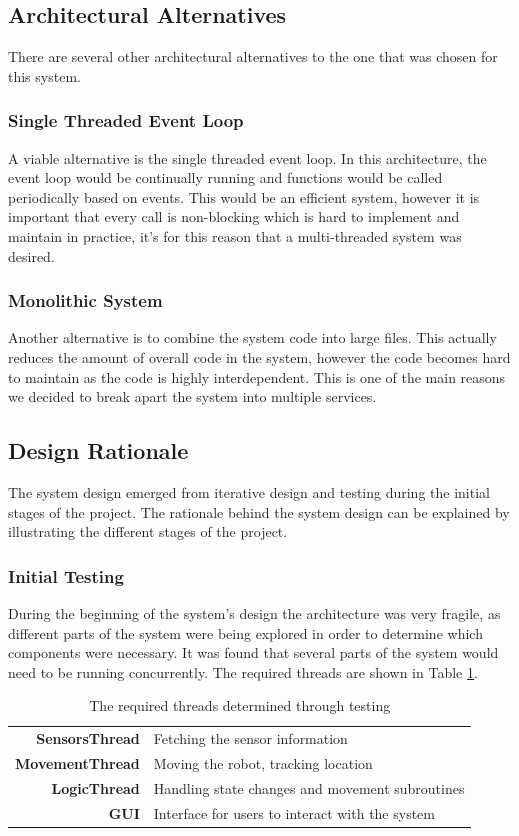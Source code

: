 \subsection{Architectural Alternatives}
There are several other architectural alternatives to the one that was chosen for this system. 

\subsubsection*{Single Threaded Event Loop}
A viable alternative is the single threaded event loop. In this architecture, the event loop would be continually running and functions would be called periodically based on events. This would be an efficient system, however it is important that every call is non-blocking which is hard to implement and maintain in practice, it's for this reason that a multi-threaded system was desired.

\subsubsection*{Monolithic System}
Another alternative is to combine the system code into large files. This actually reduces the amount of overall code in the system, however the code becomes hard to maintain as the code is highly interdependent. This is one of the main reasons we decided to break apart the system into multiple services.

\subsection{Design Rationale}
The system design emerged from iterative design and testing during the initial stages of the project. The rationale behind the system design can be explained by illustrating the different stages of the project.

\subsubsection{Initial Testing}
During the beginning of the system's design the architecture was very fragile, as different parts of the system were being explored in order to determine which components were necessary. It was found that several parts of the system would need to be running concurrently. The required threads are shown in Table \ref{designInit}.

\begin{table}[H]
\begin{tabular}{>{\bfseries}r l}
	SensorsThread & Fetching the sensor information \\
	MovementThread & Moving the robot, tracking location \\
	LogicThread & Handling state changes and movement subroutines \\
	GUI & Interface for users to interact with the system \\
\end{tabular}
\caption{\label{designInit}The required threads determined through testing}
\end{table}

